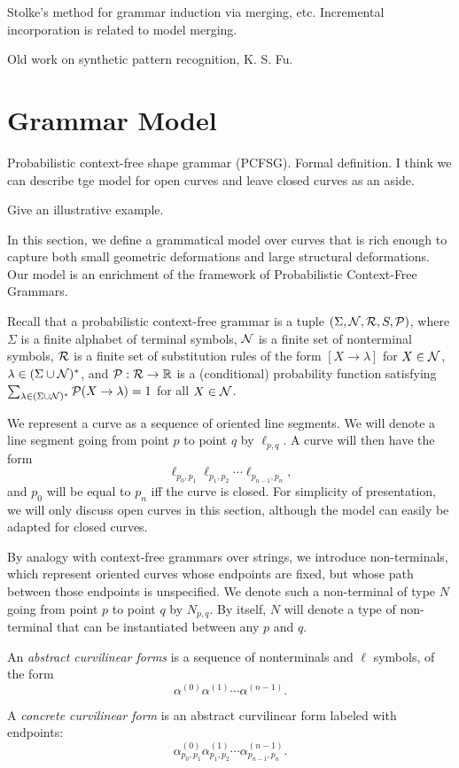 \documentclass[10pt]{article}
\begin{document}
Stolke's method for grammar induction via merging, etc.  Incremental
incorporation is related to model merging.
\cite{Stolcke1994Bayesian}

Old work on synthetic pattern recognition, K. S. Fu.

\section{Grammar Model}

\bitem
\item Probabilistic context-free shape grammar (PCFSG). Formal
  definition.  I think we can describe tge model for open curves and
  leave closed curves as an aside.
\item Give an illustrative example.
  \eitem

In this section, we define a grammatical model over curves that is
rich enough to capture both small geometric deformations and large
structural deformations. Our model is an enrichment of the framework
of Probabilistic Context-Free Grammars.

Recall that a probabilistic context-free grammar is a tuple $(\Sigma,
{\mathcal N}, {\mathcal R}, S, {\mathcal P})$, where $\Sigma$ is a finite alphabet of terminal
symbols, ${\mathcal N}$ is a finite set of nonterminal symbols, ${\mathcal R}$ is a
finite set of substitution rules of the form $[X\to \lambda]$ for
$X\in {\mathcal N}$, $\lambda \in (\Sigma \cup {\mathcal N})^*$, and ${\mathcal P} : {\mathcal R}\to
\mathbb{R}$ is a (conditional) probability function satisfying
$\sum_{\lambda\in (\Sigma\cup {\mathcal N})^*} {\mathcal P}(X\to \lambda) = 1$ for all
$X\in {\mathcal N}$. 

We represent a curve as a sequence of oriented line segments. We will
denote a line segment going from point $p$ to point $q$ by
$\ell_{p,q}$. A curve will then have the form
$$ \ell_{p_0,p_1} \ell_{p_1,p_2}\cdots \ell_{p_{n-1},p_n},$$ and $p_0$
will be equal to $p_n$ iff the curve is closed. For simplicity of
presentation, we will only discuss open curves in this section,
although the model can easily be adapted for closed curves.

By analogy with context-free grammars over strings, we introduce
non-terminals, which represent oriented curves whose endpoints are
fixed, but whose path between those endpoints is unspecified. We
denote such a non-terminal of type $N$ going from point $p$ to point
$q$ by $N_{p,q}$. By itself, $N$ will denote a type of non-terminal
that can be instantiated between any $p$ and $q$.

\begin{defn}
An {\em abstract curvilinear forms} is a sequence of nonterminals and
$\ell$ symbols, of the form
$$ \alpha^{(0)} \alpha^{(1)} \cdots \alpha^{(n-1)}.$$ 

A {\em concrete curvilinear form} is an abstract curvilinear form
labeled with endpoints:
$$ \alpha^{(0)}_{p_0,p_1} \alpha^{(1)}_{p_1,p_2} \cdots
\alpha^{(n-1)}_{p_{n-1},{p_n}}.$$ 
\end{defn}
\end{document}
